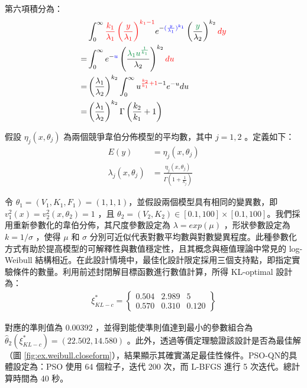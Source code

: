 第六項積分為：
\begin{align*}
&\int_{0}^{\infty}\textcolor{red}{\frac{k_1}{\lambda_1} \left(\frac{y}{\lambda_1}\right)^{k_1-1}} e^{-\textcolor{blue}{(\frac{y}{\lambda_1})^{k_1}}}\left(\frac{\textcolor{PowerPointGreen}{y}}{\lambda_2}\right)^{k_2} \textcolor{red}{dy}\\
=&\int_{0}^{\infty}e^{-\textcolor{blue}{u}}\left(\frac{\textcolor{PowerPointGreen}{\lambda_1u^{\frac{1}{k_1}}}}{\lambda_2}\right)^{k_2} \textcolor{red}{du}\\
=&\left(\frac{\lambda_1}{\lambda_2}\right)^{k_2}\int_{0}^{\infty}u^{\textcolor{red}{\frac{k_2}{k_1}+1}-1}e^{-u} du\\
=&\left(\frac{\lambda_1}{\lambda_2}\right)^{k_2}\Gamma\left(\frac{k_2}{k_1}+1\right)
\end{align*}

\hspace*{8mm} 假設 $\eta_j(x,\theta_j)$ 為兩個競爭韋伯分佈模型的平均數，其中 $j=1,2$ 。定義如下：
\begin{align}
E(y)&=\eta_j(x,\theta_j) \\
\lambda_j(x,\theta_j)&=\frac{\eta_j(x,\theta_j)}{\Gamma \left(1+\frac{1}{k_j}\right)}
\end{align}

\hspace*{8mm} 令 $\theta_1=(V_1,K_1,F_1)=(1,1,1)$，並假設兩個模型具有相同的變異數，即 $v^2_1(x)=v^2_2(x,\theta_2)=1$ ，且 $\theta_2=(V_2,K_2) \in [0.1,100] \times [0.1,100]$。我們採用重新參數化的韋伯分佈，其尺度參數設定為 $\lambda=exp(\mu)$ ，形狀參數設定為 $k=1/\sigma$ ，使得 $\mu$ 和 $\sigma$ 分別可近似代表對數平均數與對數變異程度。此種參數化方式有助於提高模型的可解釋性與數值穩定性，且其概念與極值理論中常見的 log-Weibull 結構相近\citep{coles2001introduction}。在此設計情境中，最佳化設計限定採用三個支持點，即指定實驗條件的數量。利用前述封閉解目標函數進行數值計算，所得 KL-optimal 設計為：
\begin{align*}
\xi^*_{KL-c} = \left\{\begin{array}{ccc}
0.504 & 2.989 & 5 \\
0.570 & 0.310 & 0.120
\end{array}\right\}
\end{align*}

\hspace*{8mm} 對應的準則值為 0.00392 ，並得到能使準則值達到最小的參數組合為 $\hat{\theta}_2(\xi^*_{KL-c})=(22.502,14.580)$ 。此外，透過等價定理驗證該設計是否為最佳解（圖 \ref{fig:ex.weibull.closeform}），結果顯示其確實滿足最佳性條件。PSO-QN的具體設定為：PSO 使用 64 個粒子，迭代 200 次，而 L-BFGS 進行 5 次迭代。總計算時間為 40 秒。


